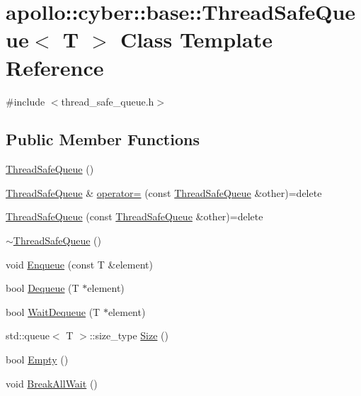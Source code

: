 \hypertarget{classapollo_1_1cyber_1_1base_1_1ThreadSafeQueue}{\section{apollo\-:\-:cyber\-:\-:base\-:\-:Thread\-Safe\-Queue$<$ T $>$ Class Template Reference}
\label{classapollo_1_1cyber_1_1base_1_1ThreadSafeQueue}
}


{\ttfamily \#include $<$thread\-\_\-safe\-\_\-queue.\-h$>$}

\subsection*{Public Member Functions}
\begin{DoxyCompactItemize}
\item 
\hyperlink{classapollo_1_1cyber_1_1base_1_1ThreadSafeQueue_a53faa68b0280565bc0bf19a33fc27116}{Thread\-Safe\-Queue} ()
\item 
\hyperlink{classapollo_1_1cyber_1_1base_1_1ThreadSafeQueue}{Thread\-Safe\-Queue} \& \hyperlink{classapollo_1_1cyber_1_1base_1_1ThreadSafeQueue_aa6d4c30efe955f33df9f71edcf6b1925}{operator=} (const \hyperlink{classapollo_1_1cyber_1_1base_1_1ThreadSafeQueue}{Thread\-Safe\-Queue} \&other)=delete
\item 
\hyperlink{classapollo_1_1cyber_1_1base_1_1ThreadSafeQueue_a658904b7d330cbe47d394449eb0ad19f}{Thread\-Safe\-Queue} (const \hyperlink{classapollo_1_1cyber_1_1base_1_1ThreadSafeQueue}{Thread\-Safe\-Queue} \&other)=delete
\item 
\hyperlink{classapollo_1_1cyber_1_1base_1_1ThreadSafeQueue_a37ff6193b7dad424f4dd16725fa9bd94}{$\sim$\-Thread\-Safe\-Queue} ()
\item 
void \hyperlink{classapollo_1_1cyber_1_1base_1_1ThreadSafeQueue_a5addc88d4aa0df085f4ca3192f2bae84}{Enqueue} (const T \&element)
\item 
bool \hyperlink{classapollo_1_1cyber_1_1base_1_1ThreadSafeQueue_a3509bdfe83511676d1ee791909f255d5}{Dequeue} (T $\ast$element)
\item 
bool \hyperlink{classapollo_1_1cyber_1_1base_1_1ThreadSafeQueue_abe3c4fe75f0f4f375d77a35a6f84ce22}{Wait\-Dequeue} (T $\ast$element)
\item 
std\-::queue$<$ T $>$\-::size\-\_\-type \hyperlink{classapollo_1_1cyber_1_1base_1_1ThreadSafeQueue_a00b7d801b1e3ab4ac30800640ff8ff92}{Size} ()
\item 
bool \hyperlink{classapollo_1_1cyber_1_1base_1_1ThreadSafeQueue_a30f40e14eaf493d221c0a1a3f11fc8ca}{Empty} ()
\item 
void \hyperlink{classapollo_1_1cyber_1_1base_1_1ThreadSafeQueue_a7bd0c67a33cb0b2bd0530370c13dc046}{Break\-All\-Wait} ()
\end{DoxyCompactItemize}
